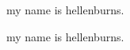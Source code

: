 \documentclass{exam}
\begin{document}
	
\begin{questions}
\question my name is hellenburns.
	

	
\question my name is hellenburns.

\lipsum[1-50]



\end{questions}
\end{document}
